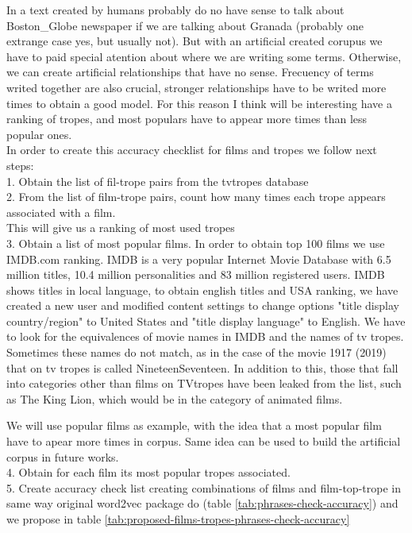 \documentclass[letterpaper]{article}
\begin{document}
	   In a text created by humans probably do no have sense to talk about Boston_Globe newspaper if we are talking about Granada (probably one extrange case yes, but usually not). But with an artificial created corupus we have to paid special atention about where we are writing some terms. Otherwise, we can create artificial relationships that have no sense. Frecuency of terms writed together are also crucial, stronger relationships have to be writed more times to obtain a good model. For this reason I think will be interesting have a ranking of tropes, and most populars have to appear more times than less popular ones. \\
	   
	  
	  In order to create this accuracy checklist for films and tropes we follow next steps:\\
	  1. Obtain the list of fil-trope pairs from the tvtropes database\\
	  2. From the list of film-trope pairs, count how many times each trope appears associated with a film.\\ This will give us a ranking of most used tropes\\
	  3. Obtain a list of most  popular films.
	     In order to obtain top 100 films we use IMDB.com ranking. IMDB is a very popular Internet Movie Database with 6.5 million titles, 10.4 million personalities and 83 million registered users. IMDB shows titles in local language, to obtain english titles and USA ranking, we have created a new user and modified content settings to change options "title display country/region" to United States and "title display language" to English. We have to look for the 
	     equivalences of movie names in IMDB and the names of tv tropes. Sometimes these names do not match, as in the 
	     case of the movie 1917 (2019) that on tv tropes is called NineteenSeventeen. In addition to this, those that fall into categories other than films on TVtropes have been leaked from the list, such as The King Lion, which would be in the category of animated films.
	     
	     
	     We will use popular films as example, with the idea that a most popular film have to apear more times in corpus. Same idea can be used to build the artificial corpus in future works.\\
      4. Obtain for each film its most popular tropes associated.\\
      5. Create accuracy check list creating combinations of films and film-top-trope in same way original word2vec package do (table \ref{tab:phrases-check-accuracy}) and we propose in table \ref{tab:proposed-films-tropes-phrases-check-accuracy}\\ 
      
\end{document}
